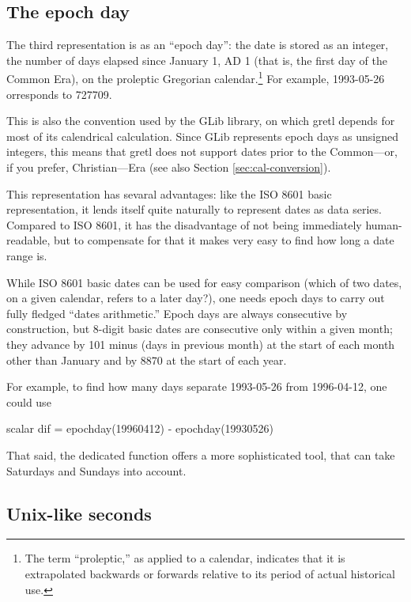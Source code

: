 \subsection{The epoch day}
\label{sec:cal-epochday}

The third representation is as an ``epoch day'': the date is stored as
an integer, the number of days elapsed since January 1, AD 1 (that is,
the first day of the Common Era), on the proleptic Gregorian
calendar.\footnote{The term ``proleptic,'' as applied to a calendar,
  indicates that it is extrapolated backwards or forwards relative to
  its period of actual historical use.} For example, 1993-05-26
orresponds to 727709.

This is also the convention used by the \textsf{GLib} library, on
which gretl depends for most of its calendrical calculation. Since
\textsf{GLib} represents epoch days as unsigned integers, this means
that gretl does not support dates prior to the Common---or, if you
prefer, Christian---Era (see also Section \ref{sec:cal-conversion}).

This representation has sevaral advantages: like the ISO 8601 basic
representation, it lends itself quite naturally to represent dates as
data series. Compared to ISO 8601, it has the disadvantage of not
being immediately human-readable, but to compensate for that it makes
very easy to find how long a date range is.

While ISO 8601 basic dates can be used for easy comparison (which of
two dates, on a given calendar, refers to a later day?), one needs
epoch days to carry out fully fledged ``dates arithmetic.''  Epoch
days are always consecutive by construction, but 8-digit basic dates
are consecutive only within a given month; they advance by 101 minus
(days in previous month) at the start of each month other than January
and by 8870 at the start of each year.

For example, to find how many days separate 1993-05-26 from
1996-04-12, one could use
\begin{code}
  scalar dif = epochday(19960412) - epochday(19930526)
\end{code}
That said, the dedicated function  offers a more
sophisticated tool, that can take Saturdays and Sundays into account.

\subsection{Unix-like seconds}
\label{sec:cal-seconds}

